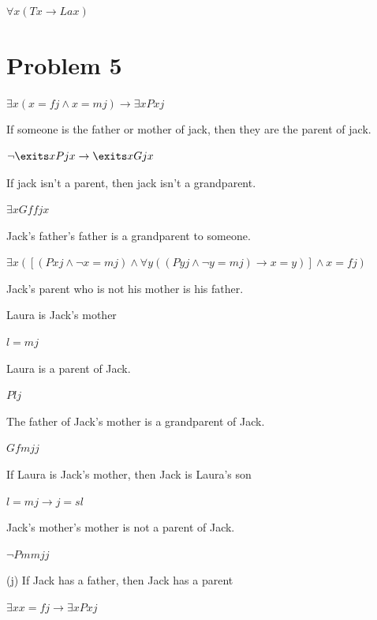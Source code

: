\documentclass[12pt]{article}
\begin{document}
$\forall x (Tx \rightarrow Lax)$

\section*{Problem 5}

$\exists x (x = fj \land x = mj) \rightarrow \exists x Pxj$

If someone is the father or mother of jack, then they are the parent of jack. 

$\lnot \exits x Pjx \rightarrow \exits x Gjx$

If jack isn't a parent, then jack isn't a grandparent. 

$\exists xGffjx$

Jack's father's father is a grandparent to someone.  

$\exists x([(Pxj \land \lnot x = mj) \land \forall y((Pyj \land \lnot y = mj) \rightarrow x = y)] \land x = fj) $

Jack's parent who is not his mother is his father. 

Laura is Jack’s mother 

$l = mj$

Laura is a parent of Jack. 

$Plj$

The father of Jack’s mother is a grandparent of Jack. 

$Gfmjj$

If Laura is Jack’s mother, then Jack is Laura’s son 

$l = mj \rightarrow j = sl$

Jack’s mother’s mother is not a parent of Jack. 

$\lnot Pmmjj$ 

(j) If Jack has a father, then Jack has a parent

$\exists x x = fj \rightarrow \exists x Pxj$
\end{document}
